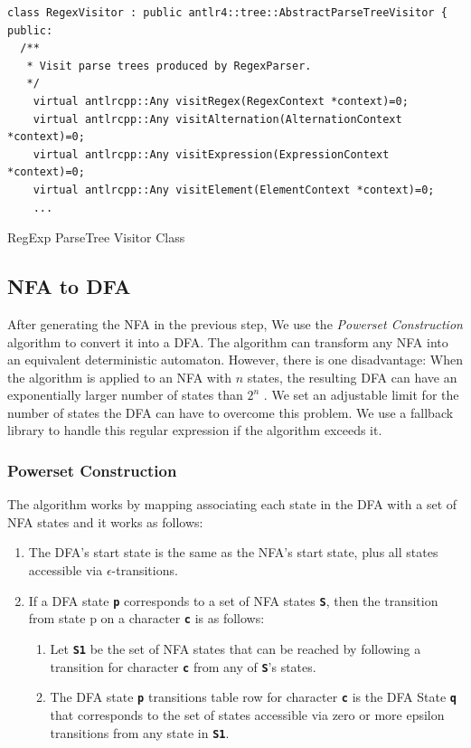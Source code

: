\begin{listing}[htpb]
\begin{verbatim}
class RegexVisitor : public antlr4::tree::AbstractParseTreeVisitor {
public:
  /**
   * Visit parse trees produced by RegexParser.
   */
    virtual antlrcpp::Any visitRegex(RegexContext *context)=0;
    virtual antlrcpp::Any visitAlternation(AlternationContext *context)=0;
    virtual antlrcpp::Any visitExpression(ExpressionContext *context)=0;
    virtual antlrcpp::Any visitElement(ElementContext *context)=0;
    ...
\end{verbatim}
\caption[RegExp ParseTree Visitor Class]{RegExp ParseTree Visitor Class}\label{lst:fasvisitor}
\end{listing}


\subsection{NFA to DFA}\label{subsection:nfdtodfa}
After generating the NFA in the previous step, We use the \textit{Powerset Construction} algorithm to convert it into a DFA. The algorithm can transform any NFA into an equivalent deterministic automaton. However, there is one disadvantage: When the algorithm is applied to an NFA with $n$ states, the resulting DFA can have an exponentially larger number of states than $2^n$ \cite{dfasize}. We set an adjustable limit for the number of states the DFA can have to overcome this problem. We use a fallback library to handle this regular expression if the algorithm exceeds it.

\subsubsection{Powerset Construction}
The algorithm works by mapping associating each state in the DFA with a set of NFA states and it works as follows:
\begin{enumerate}
    \item The DFA's start state is the same as the NFA's start state, plus all states accessible via $\epsilon$-transitions.
    \item If a DFA state \texttt{\textbf{p}} corresponds to a set of NFA states \texttt{\textbf{S}}, then the transition from state p on a character \texttt{\textbf{c}} is as follows:
    \begin{enumerate}
        \item Let \texttt{\textbf{S1}} be the set of NFA states that can be reached by following a transition for character \texttt{\textbf{c}} from any of \texttt{\textbf{S}}'s states.
        \item The DFA state \texttt{\textbf{p}} transitions table row for character \texttt{\textbf{c}} is the DFA State \texttt{\textbf{q}} that corresponds to the set of states accessible via zero or more epsilon transitions from any state in \texttt{\textbf{S1}}.
    \end{enumerate}
\end{enumerate}
 

